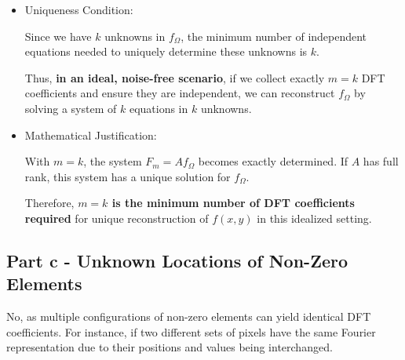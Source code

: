 \documentclass{article}
\begin{document}
\begin{itemize}
    \item Uniqueness Condition:
    
    Since we have \( k \) unknowns in \( f_\Omega \), the minimum number of independent equations needed to uniquely determine these unknowns is \( k \).
    
    Thus, \textbf{in an ideal, noise-free scenario}, if we collect exactly \( m = k \) DFT coefficients and ensure they are independent, we can reconstruct \( f_\Omega \) by solving a system of \( k \) equations in \( k \) unknowns.

    \item Mathematical Justification:

    With \( m = k \), the system \( F_m = A f_\Omega \) becomes exactly determined. If \( A \) has full rank, this system has a unique solution for \( f_\Omega \).
    
    Therefore, \textbf{\( m = k \) is the minimum number of DFT coefficients required} for unique reconstruction of \( f(x, y) \) in this idealized setting.

\end{itemize}

\subsection*{Part c - Unknown Locations of Non-Zero Elements}

No, as multiple configurations of non-zero elements can yield identical DFT coefficients. For instance, if two different sets of pixels have the same Fourier representation due to their positions and values being interchanged.
\end{document}
